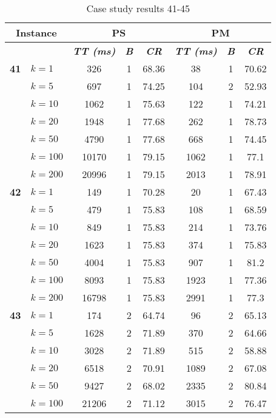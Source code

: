     \begin{table}[htbp]
    \caption{Case study results 41-45}
    \centering
    \begin{tabular}{|l|l|c|c|c|c|c|c|}
    \hline
    \multicolumn{ 2}{|c|}{\textbf{Instance}} & \multicolumn{ 3}{c|}{\textbf{PS}} & \multicolumn{ 3}{c|}{\textbf{PM}} \\ \hline
    \multicolumn{ 2}{|l|}{} & \textbf{\textit{TT (ms)}} & \textbf{\textit{B}} & \textbf{\textit{CR}} & \textbf{\textit{TT (ms)}} & \textbf{\textit{B}} & \textbf{\textit{CR}} \\ \hline
    \multicolumn{1}{|r|}{\textbf{41}} & $k=1$ & 326 & 1 & 68.36 & 38 & 1 & 70.62 \\ 
     & $k=5$ & 697 & 1 & 74.25 & 104 & 2 & 52.93 \\ 
     & $k=10$ & 1062 & 1 & 75.63 & 122 & 1 & 74.21 \\ 
     & $k=20$ & 1948 & 1 & 77.68 & 262 & 1 & 78.73 \\ 
     & $k=50$ & 4790 & 1 & 77.68 & 668 & 1 & 74.45 \\ 
     & $k=100$ & 10170 & 1 & 79.15 & 1062 & 1 & 77.1 \\ 
     & $k=200$ & 20996 & 1 & 79.15 & 2013 & 1 & 78.91 \\ \hline
    \multicolumn{1}{|r|}{\textbf{42}} & $k=1$ & 149 & 1 & 70.28 & 20 & 1 & 67.43 \\ 
     & $k=5$ & 479 & 1 & 75.83 & 108 & 1 & 68.59 \\ 
     & $k=10$ & 849 & 1 & 75.83 & 214 & 1 & 73.76 \\ 
     & $k=20$ & 1623 & 1 & 75.83 & 374 & 1 & 75.83 \\ 
     & $k=50$ & 4004 & 1 & 75.83 & 907 & 1 & 81.2 \\ 
     & $k=100$ & 8093 & 1 & 75.83 & 1923 & 1 & 77.36 \\ 
     & $k=200$ & 16798 & 1 & 75.83 & 2991 & 1 & 77.3 \\ \hline
    \multicolumn{1}{|r|}{\textbf{43}} & $k=1$ & 174 & 2 & 64.74 & 96 & 2 & 65.13 \\ 
     & $k=5$ & 1628 & 2 & 71.89 & 370 & 2 & 64.66 \\ 
     & $k=10$ & 3028 & 2 & 71.89 & 515 & 2 & 58.88 \\ 
     & $k=20$ & 6518 & 2 & 70.91 & 1089 & 2 & 67.08 \\ 
     & $k=50$ & 9427 & 2 & 68.02 & 2335 & 2 & 80.84 \\ 
     & $k=100$ & 21206 & 2 & 71.12 & 3015 & 2 & 76.47 \\ 

\end{tabular}
\end{table}
